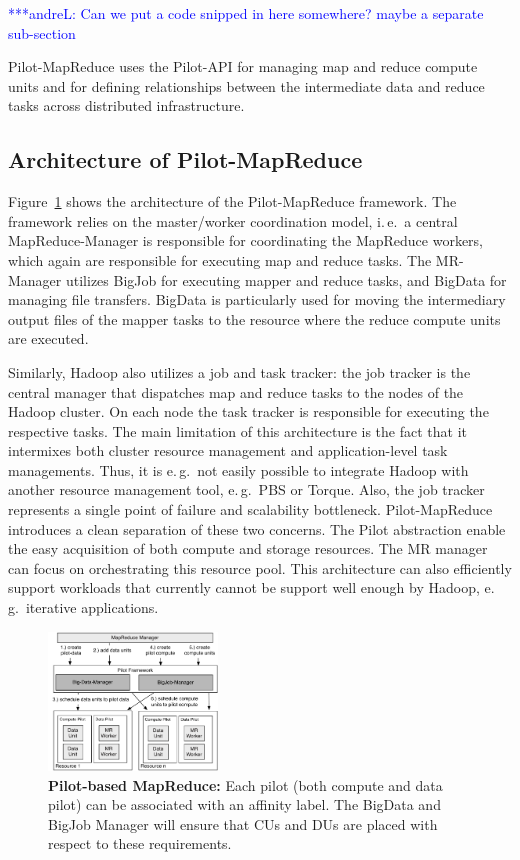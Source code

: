 \documentclass{acm_proc_article-sp}
\newcommand{\alnote}[1]{ {\textcolor{blue} { ***andreL: #1 }}}
\newcommand{\alnote}[1]{}
\newcommand{\pilot}{Pilot\xspace}
\newcommand{\pilotmapreduce}{Pilot-MapReduce\xspace}
\begin{document}
\alnote{Can we put a code snipped in here somewhere? maybe a separate sub-section}

\pilotmapreduce uses the Pilot-API for managing map and reduce compute units
and for defining relationships between the intermediate data and reduce tasks
across distributed infrastructure. 


\subsection{Architecture of Pilot-MapReduce}

Figure~\ref{fig:figures_mapreduce-pilotdata} shows the architecture of the
\pilotmapreduce framework. The framework relies on the master/worker
coordination model, i.\,e.\ a central MapReduce-Manager is responsible for
coordinating the MapReduce workers, which again are responsible for executing
map and reduce tasks. The MR-Manager utilizes BigJob for executing
mapper and reduce tasks, and BigData for managing file transfers.
BigData is particularly used for moving the intermediary output files of
the mapper tasks to the resource where the reduce compute units are executed.

Similarly, Hadoop also utilizes a job and task tracker: the job tracker is the
central manager that dispatches map and reduce tasks to the nodes of the
Hadoop cluster. On each node the task tracker is responsible for executing the
respective tasks. The main limitation of this architecture is the fact that it
intermixes both cluster resource management and application-level task
managements. Thus, it is e.\,g.\ not easily possible to integrate Hadoop with
another resource management tool, e.\,g.\ PBS or Torque. Also, the job tracker
represents a single point of failure and scalability bottleneck.
Pilot-MapReduce introduces a clean separation of these two concerns. The
\pilot abstraction enable the easy acquisition of both compute and storage
resources. The MR manager can focus on orchestrating this resource pool. This architecture can also efficiently support workloads that currently cannot be support well enough by Hadoop, e.\,g.\ iterative applications.

\begin{figure}[htbp]
	\centering
	\includegraphics[width=0.4\textwidth]{figures/mapreduce-pilotdata.pdf}
	\caption{\textbf{Pilot-based MapReduce:} Each pilot (both compute and data 
	pilot) can be associated with an affinity label. The BigData and BigJob 
	Manager will ensure that CUs and DUs are placed with respect to these 
	requirements.}
	\label{fig:figures_mapreduce-pilotdata}
\end{figure}
\end{document}
